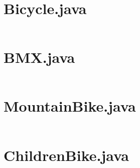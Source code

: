 \section{Bicycle.java}
\inputminted{java}{../src/Bicycle.java}

\section{BMX.java}
\inputminted{java}{../src/BMX.java}

\section{MountainBike.java}
\inputminted{java}{../src/MountainBike.java}

\section{ChildrenBike.java}
\inputminted{java}{../src/ChildrenBike.java}

\endinput

